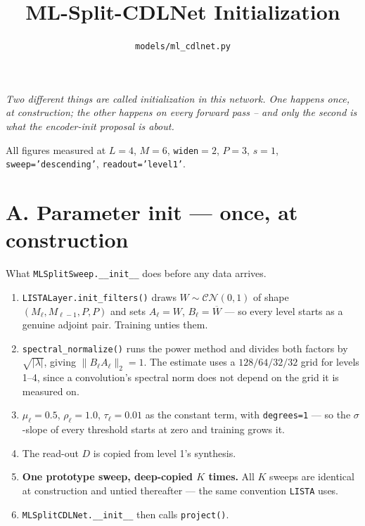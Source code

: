 \documentclass[11pt]{article}
\title{\textbf{ML-Split-CDLNet Initialization}}
\author{\texttt{models/ml\_cdlnet.py}}
\date{}
\begin{document}
\maketitle
\vspace{-2.5em}

\noindent\textit{Two different things are called initialization in this network. One happens once, at
construction; the other happens on every forward pass -- and only the second is what the encoder-init
proposal is about.}

\vspace{0.5em}
\noindent\textcolor{faint}{\small All figures measured at $L=4$, $M=6$, \texttt{widen}$=2$, $P=3$, $s=1$,
\texttt{sweep='descending'}, \texttt{readout='level1'}.}

\section*{A. Parameter init --- once, at construction}

What \texttt{MLSplitSweep.\_\_init\_\_} does before any data arrives.

\begin{enumerate}\itemsep2pt
  \item \texttt{LISTALayer.init\_filters()} draws $W \sim \mathcal{CN}(0,1)$ of shape
        $(M_\ell, M_{\ell-1}, P, P)$ and sets $A_\ell = W$, $B_\ell = \overline{W}$ --- so every level starts
        as a genuine adjoint pair. Training unties them.
  \item \texttt{spectral\_normalize()} runs the power method and divides both factors by
        $\sqrt{|\lambda|}$, giving $\|B_\ell A_\ell\|_2 = 1$. The estimate uses a $128/64/32/32$ grid for
        levels 1--4, since a convolution's spectral norm does not depend on the grid it is measured on.
  \item $\mu_\ell = 0.5$, $\rho_\ell = 1.0$, $\tau_\ell = 0.01$ as the constant term, with
        \texttt{degrees=1} --- so the $\sigma$-slope of every threshold starts at zero and training grows it.
  \item The read-out $D$ is copied from level 1's synthesis.
  \item \textbf{One prototype sweep, deep-copied $K$ times.} All $K$ sweeps are identical at construction
        and untied thereafter --- the same convention \texttt{LISTA} uses.
  \item \texttt{MLSplitCDLNet.\_\_init\_\_} then calls \texttt{project()}.
\end{enumerate}
\end{document}
